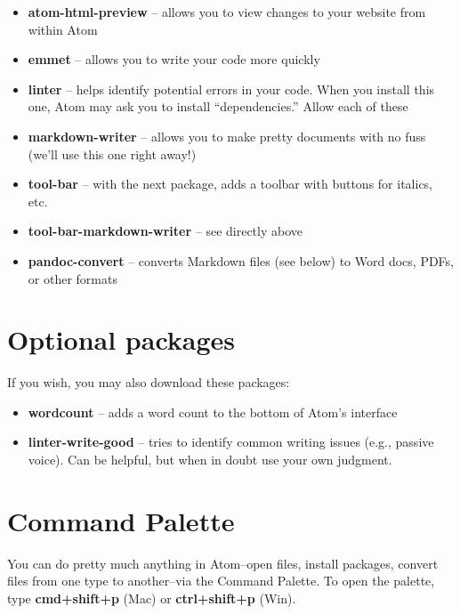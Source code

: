 \documentclass[]{book}
\providecommand{\tightlist}{%
  \setlength{\itemsep}{0pt}\setlength{\parskip}{0pt}}
\theoremstyle{definition}
\theoremstyle{definition}
\theoremstyle{definition}
\theoremstyle{remark}
\begin{document}
\begin{enumerate}
  \begin{itemize}
  \tightlist
  \item
    \textbf{atom-html-preview} -- allows you to view changes to your
    website from within Atom
  \item
    \textbf{emmet} -- allows you to write your code more quickly
  \item
    \textbf{linter} -- helps identify potential errors in your code.
    When you install this one, Atom may ask you to install
    ``dependencies.'' Allow each of these
  \item
    \textbf{markdown-writer} -- allows you to make pretty documents with
    no fuss (we'll use this one right away!)
  \item
    \textbf{tool-bar} -- with the next package, adds a toolbar with
    buttons for italics, etc.
  \item
    \textbf{tool-bar-markdown-writer} -- see directly above
  \item
    \textbf{pandoc-convert} -- converts Markdown files (see below) to
    Word docs, PDFs, or other formats
  \end{itemize}
\end{enumerate}

\hypertarget{optional-packages}{%
\section{Optional packages}\label{optional-packages}}

If you wish, you may also download these packages:

\begin{itemize}
\tightlist
\item
  \textbf{wordcount} -- adds a word count to the bottom of Atom's
  interface
\item
  \textbf{linter-write-good} -- tries to identify common writing issues
  (e.g., passive voice). Can be helpful, but when in doubt use your own
  judgment.
\end{itemize}

\hypertarget{command-palette}{%
\section{Command Palette}\label{command-palette}}

You can do pretty much anything in Atom--open files, install packages,
convert files from one type to another--via the Command Palette. To open
the palette, type \textbf{cmd+shift+p} (Mac) or \textbf{ctrl+shift+p}
(Win).
\end{document}
